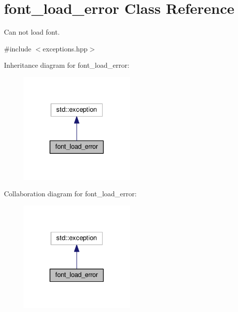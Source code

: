 \hypertarget{classfont__load__error}{}\section{font\+\_\+load\+\_\+error Class Reference}
\label{classfont__load__error}


Can not load font.  




{\ttfamily \#include $<$exceptions.\+hpp$>$}



Inheritance diagram for font\+\_\+load\+\_\+error\+:
\nopagebreak
\begin{figure}[H]
\begin{center}
\leavevmode
\includegraphics[width=161pt]{classfont__load__error__inherit__graph}
\end{center}
\end{figure}


Collaboration diagram for font\+\_\+load\+\_\+error\+:
\nopagebreak
\begin{figure}[H]
\begin{center}
\leavevmode
\includegraphics[width=161pt]{classfont__load__error__coll__graph}
\end{center}
\end{figure}
